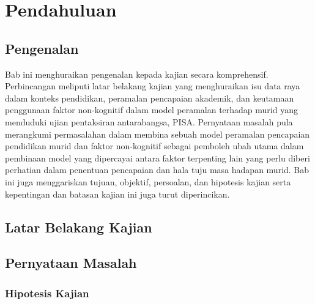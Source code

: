 \chapter{Pendahuluan}

\section{Pengenalan}
Bab ini menghuraikan pengenalan kepada kajian secara komprehensif. Perbincangan meliputi latar belakang kajian yang menghuraikan isu data raya dalam konteks pendidikan, peramalan pencapaian akademik, dan keutamaan penggunaan faktor non-kognitif dalam model peramalan terhadap murid yang menduduki ujian pentaksiran antarabangsa, PISA. Pernyataan masalah pula merangkumi permasalahan dalam membina sebuah model peramalan pencapaian pendidikan murid dan faktor non-kognitif sebagai pemboleh ubah utama dalam pembinaan model yang dipercayai antara faktor terpenting lain yang perlu diberi perhatian dalam penentuan pencapaian dan hala tuju masa hadapan murid. Bab ini juga menggariskan tujuan, objektif, persoalan, dan hipotesis kajian serta kepentingan dan batasan kajian ini juga turut diperincikan. 

\section{Latar Belakang Kajian}

\section{Pernyataan Masalah}
\subsection{Hipotesis Kajian}
